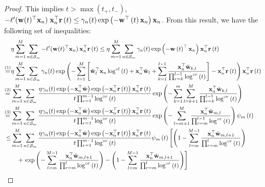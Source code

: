 \documentclass[twoside,11pt,english]{article}
\begin{document}
\begin{proof}
This implies $t>\max{(t_+,t_-)}$,  $-\ell'(\mathbf{w}(t)^\top\mathbf{x}_{n})\;\mathbf{x}_{n}^\top\mathbf{r}\left(t\right)\le \gamma_n(t)\exp\left(-\mathbf{w}^{\top}\left(t\right)\mathbf{x}_{n}\right)\mathbf{x}_{n}$. \newpage
From this result, we have the following set of inequalities:
\begin{align}
&\eta\sum_{m=1}^{M}\sum_{n\in\set_{m}}-\ell'(\wvec(t)^{\top}\xn)\,\mathbf{x}_{n}^{\top}\mathbf{r}\left(t\right)
\le  \eta\sum_{m=1}^{M}\sum_{n\in\set_{m}}\gamma_n(t)\exp\left(-\wvec\left(t\right)^\top\mathbf{x}_{n}\right)\mathbf{x}_{n}^{\top}\mathbf{r}\left(t\right)\nonumber \\
\overset{\left(1\right)}{=} & \eta\sum_{m=1}^{M}\sum_{n\in\set_{m}}\gamma_n(t)\exp\left(-\sum_{l=1}^{M}\left[\hat{\mathbf{w}}_{l}^{\top}\x_{n}\log^{\circ l}\left(t\right)+\mathbf{x}_{n}^{\top}\wtilde_{l}+\sum_{k=1}^{l-1}\frac{\mathbf{x}_{n}^{\top}\check{\mathbf{w}}_{k,l}}{\prod_{r=k}^{l-1}\log^{\circ r}\left(t\right)}\right]-\mathbf{x}_{n}^{\top}\mathbf{r}\left(t\right)\right)\mathbf{x}_{n}^{\top}\mathbf{r}\left(t\right)\nonumber \\
\overset{\left(2\right)}{=} & \sum_{m=1}^{M}\sum_{n\in\set_{m}}\frac{\eta\gamma_n(t)\exp\left(-\mathbf{x}_{n}^{\top}\wtilde\right)\exp\left(-\mathbf{x}_{n}^{\top}\mathbf{r}\left(t\right)\right)\mathbf{x}_{n}^{\top}\mathbf{r}\left(t\right)}{t\prod_{r=1}^{m-1}\log^{\circ r}\left(t\right)}\exp\left(-\sum_{k=1}^{m}\sum_{l=k+1}^{M}\frac{\mathbf{x}_{n}^{\top}\check{\mathbf{w}}_{k,l}}{\prod_{r=k}^{l-1}\log^{\circ r}\left(t\right)}\right)\nonumber \\
\overset{\left(3\right)}{=} & \sum_{m=1}^{M}\sum_{n\in\set_{m}}\frac{\eta\gamma_n(t)\exp\left(-\mathbf{x}_{n}^{\top}\wtilde\right)\exp\left(-\mathbf{x}_{n}^{\top}\mathbf{r}\left(t\right)\right)\mathbf{x}_{n}^{\top}\mathbf{r}\left(t\right)}{t\prod_{r=1}^{m-1}\log^{\circ r}\left(t\right)}\exp\left(-\sum_{l=m+1}^{M}\frac{\mathbf{x}_{n}^{\top}\check{\mathbf{w}}_{m,l}}{\prod_{r=m}^{l-1}\log^{\circ r}\left(t\right)}\right)\psi_{m}\left(t\right)\nonumber \\
\leq & \sum_{m=1}^{M}\sum_{n\in\set_{m}}\frac{\eta\gamma_n(t)\exp\left(-\mathbf{x}_{n}^{\top}\wtilde\right)\exp\left(-\mathbf{x}_{n}^{\top}\mathbf{r}\left(t\right)\right)\mathbf{x}_{n}^{\top}\mathbf{r}\left(t\right)}{t\prod_{r=1}^{m-1}\log^{\circ r}\left(t\right)}\psi_{m}\left(t\right)\left[\left(1-\sum_{l=m}^{M-1}\frac{\mathbf{x}_{n}^{\top}\check{\mathbf{w}}_{m,l+1}}{\prod_{r=m}^{l}\log^{\circ r}\left(t\right)}\right)\right.\nonumber\\
&\quad+\left.\exp\left(-\sum_{l=m}^{M-1}\frac{\mathbf{x}_{n}^{\top}\check{\mathbf{w}}_{m,l+1}}{\prod_{r=m}^{l}\log^{\circ r}\left(t\right)}\right)-\left(1-\sum_{l=m}^{M-1}\frac{\mathbf{x}_{n}^{\top}\check{\mathbf{w}}_{m,l+1}}{\prod_{r=m}^{l}\log^{\circ r}\left(t\right)}\right)\right]\label{eq: temp  main term, degenerate}

\end{align}
\end{proof}
\end{document}

